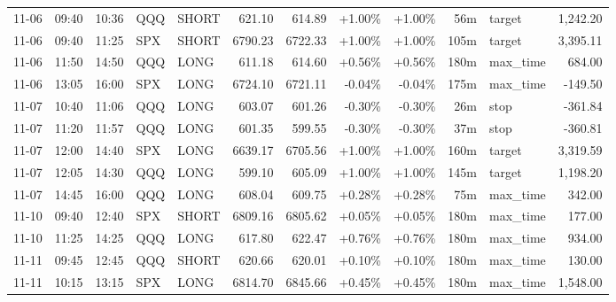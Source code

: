 \documentclass[11pt,a4paper,twoside]{article}
\begin{document}
\begin{center}
\begin{longtable}{>{\color{txtmain}}l l l l l r r r r r >{\color{txtmain}}l r}
11-06 & 09:40 & 10:36 & QQQ & SHORT & 621.10 & 614.89 & \textcolor{wingreen}{+1.00\%} & \textcolor{wingreen}{+1.00\%} & 56m & target & \textcolor{wingreen}{1,242.20} \\
11-06 & 09:40 & 11:25 & SPX & SHORT & 6790.23 & 6722.33 & \textcolor{wingreen}{+1.00\%} & \textcolor{wingreen}{+1.00\%} & 105m & target & \textcolor{wingreen}{3,395.11} \\
11-06 & 11:50 & 14:50 & QQQ & LONG & 611.18 & 614.60 & \textcolor{wingreen}{+0.56\%} & \textcolor{wingreen}{+0.56\%} & 180m & max\_time & \textcolor{wingreen}{684.00} \\
11-06 & 13:05 & 16:00 & SPX & LONG & 6724.10 & 6721.11 & \textcolor{lossred}{-0.04\%} & \textcolor{lossred}{-0.04\%} & 175m & max\_time & \textcolor{lossred}{-149.50} \\
11-07 & 10:40 & 11:06 & QQQ & LONG & 603.07 & 601.26 & \textcolor{lossred}{-0.30\%} & \textcolor{lossred}{-0.30\%} & 26m & stop & \textcolor{lossred}{-361.84} \\
11-07 & 11:20 & 11:57 & QQQ & LONG & 601.35 & 599.55 & \textcolor{lossred}{-0.30\%} & \textcolor{lossred}{-0.30\%} & 37m & stop & \textcolor{lossred}{-360.81} \\
11-07 & 12:00 & 14:40 & SPX & LONG & 6639.17 & 6705.56 & \textcolor{wingreen}{+1.00\%} & \textcolor{wingreen}{+1.00\%} & 160m & target & \textcolor{wingreen}{3,319.59} \\
11-07 & 12:05 & 14:30 & QQQ & LONG & 599.10 & 605.09 & \textcolor{wingreen}{+1.00\%} & \textcolor{wingreen}{+1.00\%} & 145m & target & \textcolor{wingreen}{1,198.20} \\
11-07 & 14:45 & 16:00 & QQQ & LONG & 608.04 & 609.75 & \textcolor{wingreen}{+0.28\%} & \textcolor{wingreen}{+0.28\%} & 75m & max\_time & \textcolor{wingreen}{342.00} \\
11-10 & 09:40 & 12:40 & SPX & SHORT & 6809.16 & 6805.62 & \textcolor{wingreen}{+0.05\%} & \textcolor{wingreen}{+0.05\%} & 180m & max\_time & \textcolor{wingreen}{177.00} \\
11-10 & 11:25 & 14:25 & QQQ & LONG & 617.80 & 622.47 & \textcolor{wingreen}{+0.76\%} & \textcolor{wingreen}{+0.76\%} & 180m & max\_time & \textcolor{wingreen}{934.00} \\
11-11 & 09:45 & 12:45 & QQQ & SHORT & 620.66 & 620.01 & \textcolor{wingreen}{+0.10\%} & \textcolor{wingreen}{+0.10\%} & 180m & max\_time & \textcolor{wingreen}{130.00} \\
11-11 & 10:15 & 13:15 & SPX & LONG & 6814.70 & 6845.66 & \textcolor{wingreen}{+0.45\%} & \textcolor{wingreen}{+0.45\%} & 180m & max\_time & \textcolor{wingreen}{1,548.00} \\

\end{longtable}
\end{center}
\end{document}
